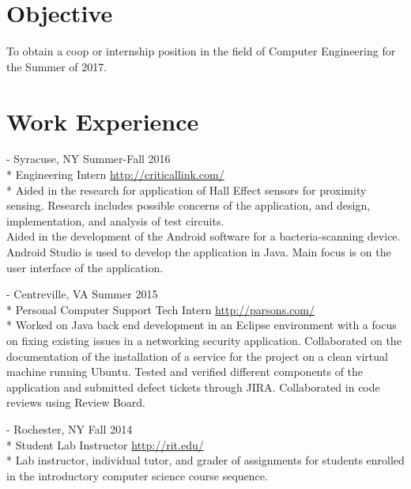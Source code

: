 \documentclass[a4paper,margin,line]{resume}
\newcommand{\rurl}[1]{\hfill {\footnotesize \url{#1}}}
\newcommand{\rdate}[1]{\hfill {\small #1}}
\renewcommand{\employer}[5]{ \item[#1] - #2 \rdate{#3} \\* #4 \rurl{#5} \\*}
\begin{document}
\begin{resume}
\section{\mysidestyle Objective}
    To obtain a coop or internship position in the field of Computer Engineering for the Summer of 2017.
\section{\mysidestyle Work Experience}
    \begin{asparadesc}
        \employer{Critical Link LLC}{Syracuse, NY}{Summer-Fall 2016}{Engineering Intern}
        {http://criticallink.com/}
        \small
        Aided in the research for application of Hall Effect sensors for proximity sensing.  
        Research includes possible concerns of the application, and design, implementation, and analysis of 
        test circuits.\smallskip\\
        Aided in the development of the Android software for a bacteria-scanning device. Android 
        Studio is used to develop the application in Java. Main focus is on the user interface of the application.
        \normalsize
        \\
        \employer{Parsons Government Services}{Centreville, VA}{Summer 2015}{Personal Computer Support Tech Intern}
        {http://parsons.com/}
        \small
        Worked on Java back end development in an Eclipse environment with a focus on fixing existing 
        issues in a networking security application. Collaborated on the documentation of the installation 
        of a service for the project on a clean virtual machine running Ubuntu. Tested and verified 
        different components of the application and submitted defect tickets through JIRA.  Collaborated 
        in code reviews using Review Board.
        \normalsize
        \\
        \employer{Rochester Institute of Technology}{Rochester, NY}{Fall 2014}{Student Lab Instructor}
        {http://rit.edu/}
        \small
        Lab instructor, individual tutor, and grader of assignments for students enrolled in the 
        introductory computer science course sequence.
        \normalsize
        \\
    \end{asparadesc}


\end{resume}
\end{document}
